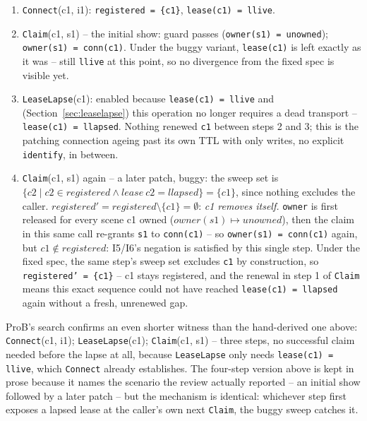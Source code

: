 \documentclass[a4paper,10pt,fleqn]{article}
\begin{document}
\begin{enumerate}
  \item \texttt{Connect}(c1, i1): \texttt{registered = \{c1\}},
    \texttt{lease(c1) = llive}.
  \item \texttt{Claim}(c1, s1) -- the initial show: guard passes
    (\texttt{owner(s1) = unowned}); \texttt{owner(s1) = conn(c1)}. Under
    the buggy variant, \texttt{lease(c1)} is left exactly as it was --
    still \texttt{llive} at this point, so no divergence from the fixed
    spec is visible yet.
  \item \texttt{LeaseLapse}(c1): enabled because \texttt{lease(c1) =
    llive} and (Section~\ref{sec:leaselapse}) this operation no longer
    requires a dead transport -- \texttt{lease(c1) = llapsed}. Nothing
    renewed \texttt{c1} between steps 2 and 3; this is the patching
    connection ageing past its own TTL with only writes, no explicit
    \texttt{identify}, in between.
  \item \texttt{Claim}(c1, s1) again -- a later patch, buggy: the sweep
    set is \(\{c2 \mathbin{|} c2 \in registered \land lease~c2 = llapsed\}
    = \{c1\}\), since nothing excludes the caller. \texttt{$registered' =
    registered \setminus \{c1\} = \emptyset$}: \emph{c1 removes itself.}
    \texttt{owner} is first released for every scene c1 owned
    (\texttt{$owner(s1) \mapsto unowned$}), then the claim in this same
    call re-grants \texttt{s1} to \texttt{conn(c1)} -- so \texttt{owner(s1)
    = conn(c1)} again, but \texttt{$c1 \notin registered$}: I5/I6's
    negation is satisfied by this single step. Under the fixed spec, the
    same step's sweep set excludes \texttt{c1} by construction, so
    \texttt{registered' = \{c1\}} -- c1 stays registered, and the renewal
    in step 1 of \texttt{Claim} means this exact sequence could not have
    reached \texttt{lease(c1) = llapsed} again without a fresh, unrenewed
    gap.
\end{enumerate}

ProB's search confirms an even shorter witness than the hand-derived one
above: \texttt{Connect}(c1, i1); \texttt{LeaseLapse}(c1); \texttt{Claim}(c1,
s1) -- three steps, no successful claim needed before the lapse at all,
because \texttt{LeaseLapse} only needs \texttt{lease(c1) = llive}, which
\texttt{Connect} already establishes. The four-step version above is kept
in prose because it names the scenario the review actually reported -- an
initial show followed by a later patch -- but the mechanism is identical:
whichever step first exposes a lapsed lease at the caller's own next
\texttt{Claim}, the buggy sweep catches it.
\end{document}
